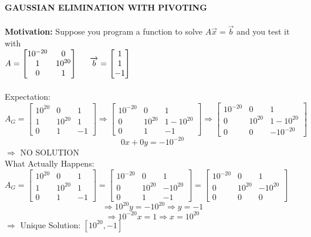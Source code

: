 \documentclass [12pt]{article}
\begin{document}
\noindent\textbf{GAUSSIAN ELIMINATION WITH PIVOTING}\\\\
\noindent\textbf{Motivation:} Suppose you program a function to solve $A\overrightarrow{x}=\overrightarrow{b}$ and you test it with \\
$A=\begin{bmatrix}
10^{-20}&0\\
1&10^{20}\\
0&1
\end{bmatrix}\indent\overrightarrow{b}=\begin{bmatrix}
1\\
1\\
-1
\end{bmatrix}$\\\\
Expectation:\\
$A_G=\begin{bmatrix}
10^{20}&0&1\\
1&10^{20}&1\\
0&1&-1
\end{bmatrix}\Rightarrow\begin{bmatrix}
10^{-20}&0&1\\
0&10^{20}&1-10^{20}\\
0&1&-1
\end{bmatrix}\Rightarrow\begin{bmatrix}
10^{-20}&0&1\\
0&10^{20}&1-10^{20}\\
0&0&-10^{-20}
\end{bmatrix}$
\[0x+0y=-10^{-20}\]
$\Rightarrow $ NO SOLUTION \\
What Actually Happens:\\
$A_G=\begin{bmatrix}
10^{20}&0&1\\
1&10^{20}&1\\
0&1&-1
\end{bmatrix}=\begin{bmatrix}
10^{-20}&0&1\\
0&10^{20}&-10^{20}\\
0&1&-1
\end{bmatrix}=\begin{bmatrix}
10^{-20}&0&1\\
0&10^{20}&-10^{20}\\
0&0&0
\end{bmatrix}$
\[\Rightarrow10^{20}y=-10^{20}\Rightarrow y=-1\]
\[\Rightarrow 10^{-20}x=1\Rightarrow x=10^{20}\]
$\Rightarrow$ Unique Solution: $[10^{20}, -1]$\\
\end{document}
